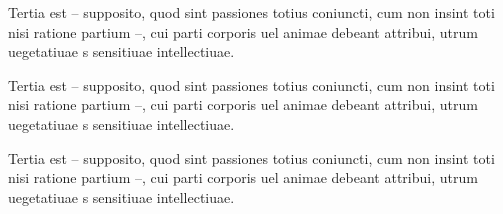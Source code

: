 \documentclass{article}
\begin{document}
\makeatletter



\def\sameword@inedtext#1{%
  \ifx\sw@list@inedtext\empty%
    \def\the@sw{999}%
  \else%
    \gl@p\sw@list@inedtext\to\the@sw%
  \fi%
  \ifcsdef{sw@#1@\the\absline@num @\the\section@num}{%
  \ifnumgreater{\csuse{sw@#1@\the\absline@num @\the\section@num}}{1}%
    {\showwordrank{#1}{\the@sw}}%
    {#1}%
  }{#1}%
}
















\newcommand{\showwordrank}[2]{%
  #1\textsuperscript{#2}%
}

\begin{ledgroup}

\beginnumbering

\pstart
Tertia est – supposito, quod sint passiones totius coniuncti, cum non insint toti nisi ratione partium –, cui parti corporis uel animae debeant attribui,  utrum uegetatiuae  s  sensitiuae 
intellectiuae.


\pend

\endnumbering
\end{ledgroup}

\begin{pairs}
\begin{Rightside}
\beginnumbering

\pstart
Tertia est – supposito, quod sint passiones totius coniuncti, cum non insint toti nisi ratione partium –, cui parti corporis uel animae debeant attribui,  utrum uegetatiuae  s  sensitiuae 
intellectiuae.


\pend

\endnumbering

\end{Rightside}
  \begin{Leftside}
\beginnumbering

\pstart
Tertia est – supposito, quod sint passiones totius coniuncti, cum non insint toti nisi ratione partium –, cui parti corporis uel animae debeant attribui,  utrum uegetatiuae  s  sensitiuae 
intellectiuae.


\pend

\endnumbering
 

  \end{Leftside}
\end{pairs}
\Columns
\end{document}
